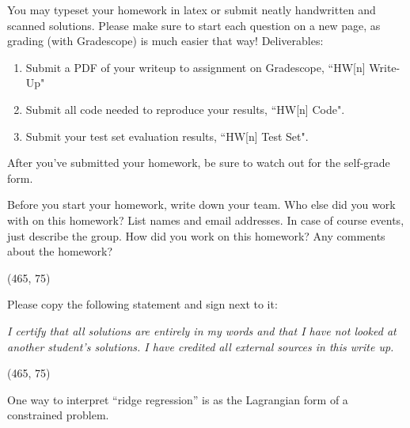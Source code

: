 
You may typeset your homework in latex or submit neatly handwritten and scanned solutions. Please make sure to start each question on a new page, as grading (with Gradescope) is much easier that way! Deliverables:

\begin{enumerate}
  \item Submit a PDF of your writeup to assignment on Gradescope, ``HW[n] Write-Up"
  \item Submit all code needed to reproduce your results, ``HW[n] Code".
  \item Submit your test set evaluation results, ``HW[n] Test Set".
\end{enumerate}

After you've submitted your homework, be sure to watch out for the self-grade form.

\begin{Parts}

\Part Before you start your homework, write down your team. Who else did you work with on this homework? List names and email addresses. In case of course events, just describe the group. How did you work on this homework? Any comments about the homework?

\vspace{15pt}
\framebox(465, 75){}

\Part Please copy the following statement and sign next to it:

\textit{I certify that all solutions are entirely in my words and that I have not looked at another student's solutions. I have credited all external sources in this write up.}

\vspace{15pt}
\framebox(465, 75){}

\end{Parts}

\pagebreak


One way to interpret ``ridge regression'' is as the Lagrangian form of a constrained problem.

